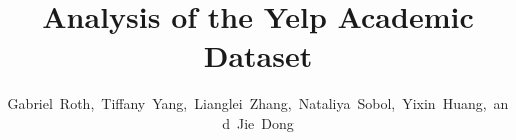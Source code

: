 \documentclass[11pt,journal,compsoc]{IEEEtran}
\begin{document}
%
\title{Analysis of the Yelp Academic Dataset}
%
%
%
%

\author{Gabriel~Roth,~Tiffany~Yang,~Lianglei~Zhang,~Nataliya~Sobol,~Yixin~Huang,~and~Jie~Dong}%
\end{document}
